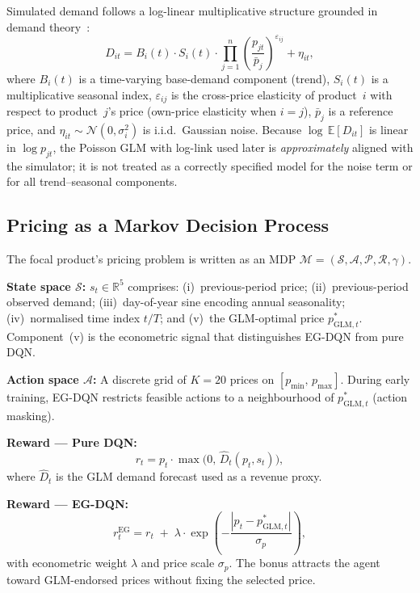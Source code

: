 \documentclass[journal, 10pt, twoside]{IEEEtran}
\begin{document}
Simulated demand follows a log-linear multiplicative structure grounded
in demand theory~\cite{kopalle2023, zhang2025}:
\begin{equation}
  D_{it} = B_i(t)\cdot S_i(t)\cdot
  \prod_{j=1}^{n}\!\left(\frac{p_{jt}}{\bar{p}_j}\right)^{\!\varepsilon_{ij}}
  + \eta_{it},
  \label{eq:dgp}
\end{equation}
where $B_i(t)$ is a time-varying base-demand component (trend),
$S_i(t)$ is a multiplicative seasonal index, $\varepsilon_{ij}$ is the
cross-price elasticity of product~$i$ with respect to product~$j$'s
price (own-price elasticity when $i=j$), $\bar{p}_j$ is a reference
price, and $\eta_{it}\sim\mathcal{N}(0,\sigma_i^2)$ is i.i.d.\ Gaussian
noise.
Because $\log\,\mathbb{E}[D_{it}]$ is linear in $\log p_{jt}$, the
Poisson GLM with log-link used later is \emph{approximately} aligned
with the simulator; it is not treated as a correctly specified model
for the noise term or for all trend--seasonal components.

\subsection{Pricing as a Markov Decision Process}

The focal product's pricing problem is written as an MDP
$\mathcal{M} = (\mathcal{S}, \mathcal{A}, \mathcal{P}, \mathcal{R},
\gamma)$.

\smallskip\noindent\textbf{State space $\mathcal{S}$:}
$s_t \in \mathbb{R}^5$ comprises:
(i)~previous-period price;
(ii)~previous-period observed demand;
(iii)~day-of-year sine encoding annual seasonality;
(iv)~normalised time index $t/T$; and
(v)~the GLM-optimal price $p^*_{\text{GLM},t}$.
Component~(v) is the econometric signal that distinguishes EG-DQN from
pure DQN.

\smallskip\noindent\textbf{Action space $\mathcal{A}$:}
A discrete grid of $K=20$ prices on $[p_{\min},\,p_{\max}]$.
During early training, EG-DQN restricts feasible actions to a
neighbourhood of $p^*_{\text{GLM},t}$ (action masking).

\smallskip\noindent\textbf{Reward --- Pure DQN:}
\begin{equation}
  r_t = p_t \cdot \max\!\bigl(0,\,\hat{D}_t(p_t, s_t)\bigr),
  \label{eq:reward_dqn}
\end{equation}
where $\hat{D}_t$ is the GLM demand forecast used as a revenue proxy.

\smallskip\noindent\textbf{Reward --- EG-DQN:}
\begin{equation}
  r_t^{\text{EG}} = r_t \;+\;
  \lambda\cdot\exp\!\!\left(-\frac{|p_t - p^*_{\text{GLM},t}|}{\sigma_p}\right),
  \label{eq:reward_egdqn}
\end{equation}
with econometric weight $\lambda$ and price scale $\sigma_p$.
The bonus attracts the agent toward GLM-endorsed prices without fixing
the selected price.
\end{document}
